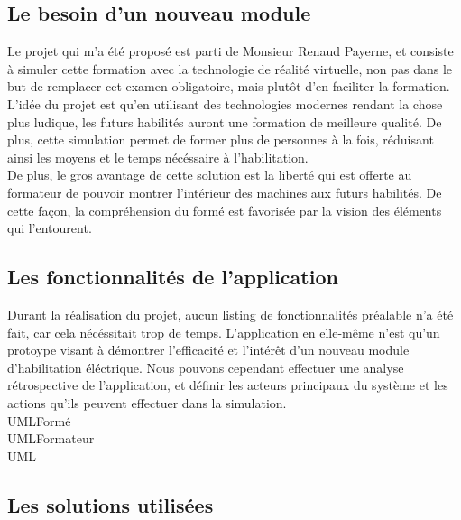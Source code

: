 \documentclass[a4paper]{article}
\begin{document}
    \subsection{Le besoin d'un nouveau module}

        Le projet qui m'a été proposé est parti de Monsieur Renaud Payerne, et consiste à simuler cette formation avec la technologie de réalité virtuelle, non pas dans le but de remplacer cet examen obligatoire, mais plutôt d'en faciliter la formation. \\

        L'idée du projet est qu'en utilisant des technologies modernes rendant la chose plus ludique, les futurs habilités auront une formation de meilleure qualité. De plus, cette simulation permet de former plus de personnes à la fois, réduisant ainsi les moyens et le temps nécéssaire à l'habilitation. \\   

        De plus, le gros avantage de cette solution est la liberté qui est offerte au formateur de pouvoir montrer l'intérieur des machines aux futurs habilités. De cette façon, la compréhension du formé est favorisée par la vision des éléments qui l'entourent. \\

    \subsection{Les fonctionnalités de l'application}

    Durant la réalisation du projet, aucun listing de fonctionnalités préalable n'a été fait, car cela nécéssitait trop de temps. L'application en elle-même n'est qu'un protoype visant à démontrer l'efficacité et l'intérêt d'un nouveau module d'habilitation éléctrique. Nous pouvons cependant effectuer une analyse rétrospective de l'application, et définir les acteurs principaux du système et les actions qu'ils peuvent effectuer dans la simulation. \\

    UMLFormé \\

    UMLFormateur \\

    UML \\

    \subsection{Les solutions utilisées}
\end{document}
